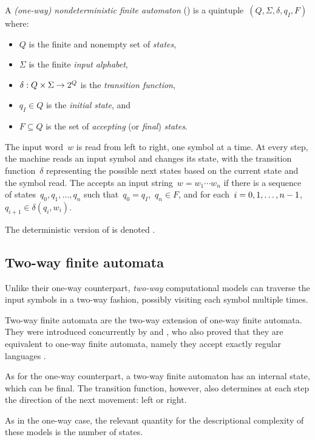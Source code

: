 \begin{defn}
	A \emph{(one-way) nondeterministic finite automaton} (\ONFA) is a quintuple~$(Q,\Sigma,\delta,q_I,F)$ where:
	\begin{itemize}
		\item $Q$ is the finite and nonempty set of \emph{states},
		\item $\Sigma$ is the finite \emph{input alphabet},
		\item $\delta:Q\times\Sigma\to2^{Q}$ is the \emph{transition function},
		\item $q_I\in Q$ is the \emph{initial state}, and
		\item $F\subseteq Q$ is the set of \emph{accepting} (or \emph{final}) \emph{states}.
	\end{itemize}
	The input word~$w$ is read from left to right, one symbol at a time.
	At every step, the machine reads an input symbol and changes its state, with the transition function~$\delta$ representing the possible next states based on the current state and the symbol read.
	The \ONFA accepts an input string~$w=w_1\cdots w_n$ if there is a sequence of states~$q_0,q_1,\dots,q_n$ such that~$q_0=q_I$,~$q_n\in F$, and for each~$i=0,1,\dots,n-1$,~$q_{i+1}\in\delta(q_i,w_i)$.

	\noindent The deterministic version of \ONFAs is denoted \ODFAs.
\end{defn}


\subsection{Two-way finite automata}
Unlike their one-way counterpart, \emph{two-way} computational models can traverse the input symbols in a two-way fashion, possibly visiting each symbol multiple times.

Two-way finite automata are the two-way extension of one-way finite automata.
They were introduced concurrently by \citeauthor{RabSco59} and \citeauthor{She59}, who also proved that they are equivalent to one-way finite automata, namely they accept exactly regular languages \cite{RabSco59,She59}.

As for the one-way counterpart, a two-way finite automaton has an internal state, which can be final.
The transition function, however, also determines at each step the direction of the next movement: left or right.

As in the one-way case, the relevant quantity for the descriptional complexity of these models is the number of states.


